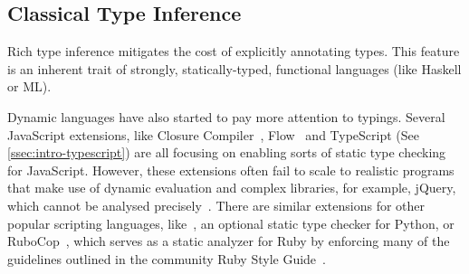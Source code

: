 \documentclass[acmsmall, review, anonymous]{acmart}\settopmatter{printfolios=true,printccs=false,printacmref=false}
\newcommand{\margincomment}[2]{\marginpar{\scriptsize\color{Maroon}#1 says: #2}}
\newcommand{\adg}[1]{\margincomment{ADG}{#1}}
\newcommand{\etb}[1]{\margincomment{Earl}{#1}}
\begin{document}
\subsection{Classical Type Inference}


Rich type inference mitigates the cost
of explicitly annotating types. This feature is an
inherent trait of strongly, statically-typed, functional languages (like Haskell or ML).


Dynamic languages have also started to pay more attention to typings. Several
JavaScript extensions, like Closure Compiler~\citep{closure}, Flow~\cite{flow} and
TypeScript (See \cref{ssec:intro-typescript}) are all focusing on enabling
sorts of static type checking for JavaScript.
%
%
However, these
extensions often fail to scale to realistic programs that make use of dynamic
evaluation and complex libraries, for example, jQuery, which cannot be analysed
precisely~\cite{jensen09}.
%
There are similar extensions for other popular scripting languages,
like~\citep{mypy}, an optional static type checker for Python,
or RuboCop~\citep{rubycop}, which serves as a static analyzer for Ruby by enforcing many of the guidelines
outlined in the community Ruby Style Guide~\citep{rubystyle}.
\end{document}
